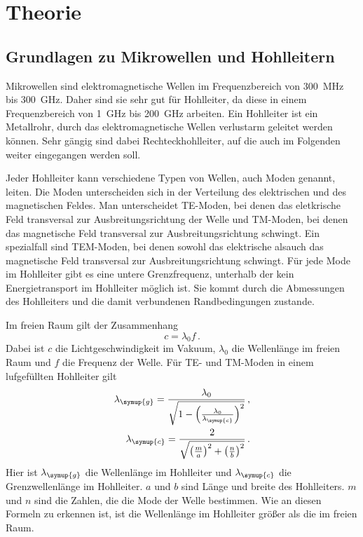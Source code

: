 \section{Theorie}
\label{sec:Theorie}

\subsection{Grundlagen zu Mikrowellen und Hohlleitern}
\label{subsec:grundlagen}
Mikrowellen sind elektromagnetische Wellen im Frequenzbereich von \SI{300}{\mega\Hz}
bis \SI{300}{\giga\Hz}. Daher sind sie sehr gut für Hohlleiter, da diese in einem
Frequenzbereich von \SI{1}{\giga\Hz} bis \SI{200}{\giga\Hz} arbeiten. Ein Hohlleiter ist
ein Metallrohr, durch das elektromagnetische Wellen verlustarm geleitet werden können.
Sehr gängig sind dabei Rechteckhohlleiter, auf die auch im Folgenden weiter eingegangen
werden soll.

Jeder Hohlleiter kann verschiedene Typen von Wellen, auch Moden genannt, leiten.
Die Moden unterscheiden sich in der Verteilung des elektrischen und des magnetischen
Feldes. Man unterscheidet TE-Moden, bei denen das eletkrische Feld transversal zur
Ausbreitungsrichtung der Welle und TM-Moden, bei denen das magnetische Feld transversal
zur Ausbreitungsrichtung schwingt. Ein spezialfall sind TEM-Moden, bei denen sowohl
das elektrische alsauch das magnetische Feld transversal zur Ausbreitungsrichtung
schwingt. Für jede Mode im Hohlleiter gibt es eine untere Grenzfrequenz, unterhalb
der kein Energietransport im Hohlleiter möglich ist. Sie kommt durch die Abmessungen
des Hohlleiters und die damit verbundenen Randbedingungen zustande.

Im freien Raum gilt der Zusammenhang
\begin{equation}
  c= \lambda_0 f\,.
  \label{eqn:frequenz}
\end{equation}
Dabei ist $c$ die Lichtgeschwindigkeit im Vakuum, $\lambda_0$ die Wellenlänge im
freien Raum und $f$ die Frequenz der Welle.
Für TE- und TM-Moden in einem lufgefüllten Hohlleiter gilt
\begin{align}
  \lambda_{\symup{g}}=\frac{\lambda_0}{\sqrt{1-\left(\frac{\lambda_0}
  {\lambda_{\symup{c}}}\right)^2}} \,, \label{eqn:hohlleiterg}\\
  \lambda_{\symup{c}}=\frac{2}{\sqrt{\left(\frac{m}{a}\right)^2+
  \left(\frac{n}{b}\right)^2}} \,.
  \label{eqn:hohlleiterc}
\end{align}
Hier ist $\lambda_{\symup{g}}$ die Wellenlänge im Hohlleiter und $\lambda_{\symup{c}}$
die Grenzwellenlänge im Hohlleiter. $a$ und $b$ sind Länge und breite des Hohlleiters.
$m$ und $n$ sind die Zahlen, die die Mode der Welle bestimmen.
Wie an diesen Formeln zu erkennen ist, ist die Wellenlänge im Hohlleiter
größer als die im freien Raum.

